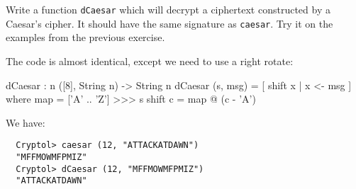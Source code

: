 \begin{Exercise}\label{ex:caesar:2}
  Write a function {\tt dCaesar} which will decrypt a ciphertext
  constructed by a Caesar's cipher. It should have the same signature
  as {\tt caesar}.  Try it on the examples from the previous exercise.
\end{Exercise}
\begin{Answer}
  The code is almost identical, except we need to use a right
  rotate:\indRotRight

\begin{code}
  dCaesar : {n} ([8], String n) -> String n
  dCaesar (s, msg) = [ shift x | x <- msg ]
        where map     = ['A' .. 'Z'] >>> s
              shift c = map @ (c - 'A')
\end{code}
We have:
\begin{Verbatim}
  Cryptol> caesar (12, "ATTACKATDAWN")
  "MFFMOWMFPMIZ"
  Cryptol> dCaesar (12, "MFFMOWMFPMIZ")
  "ATTACKATDAWN"
\end{Verbatim}
\end{Answer}

